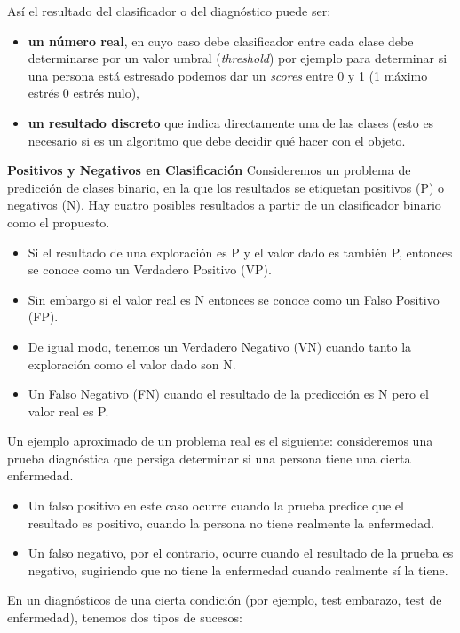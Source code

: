 \documentclass[]{book}
\providecommand{\tightlist}{%
  \setlength{\itemsep}{0pt}\setlength{\parskip}{0pt}}
\begin{document}
Así el resultado del clasificador o del diagnóstico puede ser:

\begin{itemize}
\tightlist
\item
  \textbf{un número real}, en cuyo caso debe clasificador entre cada clase debe determinarse por un valor umbral (\emph{threshold}) por ejemplo para determinar si una persona está estresado podemos dar un \emph{scores} entre 0 y 1 (1 máximo estrés 0 estrés nulo),
\item
  \textbf{un resultado discreto} que indica directamente una de las clases (esto es necesario si es un algoritmo que debe decidir qué hacer con el objeto.
\end{itemize}

 \textbf{Positivos y Negativos en Clasificación}
Consideremos un problema de predicción de clases binario, en la que los resultados se etiquetan positivos (P) o negativos (N). Hay cuatro posibles resultados a partir de un clasificador binario como el propuesto.

\begin{itemize}
\tightlist
\item
  Si el resultado de una exploración es P y el valor dado es también P, entonces se conoce como un Verdadero Positivo (VP).
\item
  Sin embargo si el valor real es N entonces se conoce como un Falso Positivo (FP).
\item
  De igual modo, tenemos un Verdadero Negativo (VN) cuando tanto la exploración como el valor dado son N.
\item
  Un Falso Negativo (FN) cuando el resultado de la predicción es N pero el valor real es P.
\end{itemize}

Un ejemplo aproximado de un problema real es el siguiente: consideremos una prueba diagnóstica que persiga determinar si una persona tiene una cierta enfermedad.

\begin{itemize}
\tightlist
\item
  Un falso positivo en este caso ocurre cuando la prueba predice que el resultado es positivo, cuando la persona no tiene realmente la enfermedad.
\item
  Un falso negativo, por el contrario, ocurre cuando el resultado de la prueba es negativo, sugiriendo que no tiene la enfermedad cuando realmente sí la tiene.
\end{itemize}

En un diagnósticos de una cierta condición (por ejemplo, test embarazo, test de enfermedad), tenemos dos tipos de sucesos:
\end{document}
